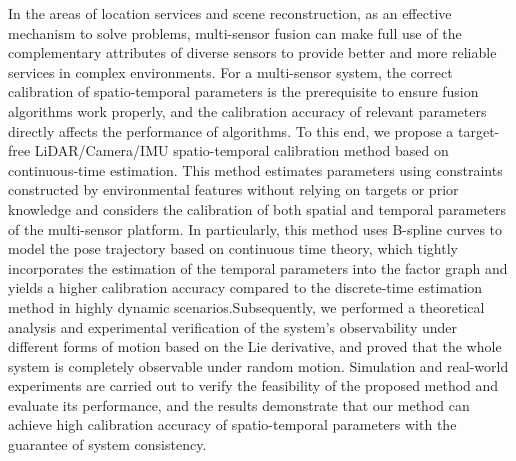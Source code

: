 
In the areas of location services and scene reconstruction, as an effective mechanism to solve problems, multi-sensor fusion can make full use of the complementary attributes of diverse sensors to provide better and more reliable services in complex environments. For a multi-sensor system, the correct calibration of spatio-temporal parameters is the prerequisite to ensure fusion algorithms work properly, and the calibration accuracy of relevant parameters directly affects the performance of algorithms. To this end, we propose a target-free LiDAR/Camera/IMU spatio-temporal calibration method based on continuous-time estimation. This method estimates parameters using constraints constructed by environmental features without relying on targets or prior knowledge and considers the calibration of both spatial and temporal parameters of the multi-sensor platform. In particularly, this method uses B-spline curves to model the pose trajectory based on continuous time theory, which tightly incorporates the estimation of the temporal parameters into the factor graph and yields a higher calibration accuracy compared to the discrete-time estimation method in highly dynamic scenarios.Subsequently, we performed a theoretical analysis and experimental verification of the system's observability under different forms of motion based on the Lie derivative, and proved that the whole system is completely observable under random motion. Simulation and real-world experiments are carried out to verify the feasibility of the proposed method and evaluate its performance, and the results demonstrate that our method can achieve high calibration accuracy of spatio-temporal parameters with the guarantee of system consistency.